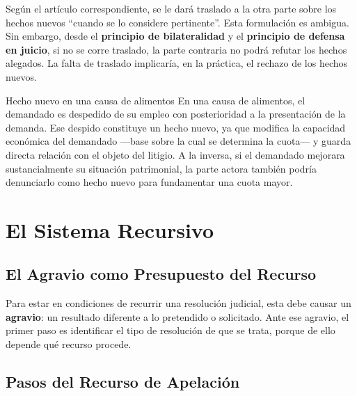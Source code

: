 \documentclass[12pt,oneside]{book}
\begin{document}
Según el artículo correspondiente, se le dará traslado a la otra parte sobre los hechos nuevos ``cuando se lo considere pertinente''. Esta formulación es ambigua. Sin embargo, desde el \textbf{principio de bilateralidad} y el \textbf{principio de defensa en juicio}, si no se corre traslado, la parte contraria no podrá refutar los hechos alegados. La falta de traslado implicaría, en la práctica, el rechazo de los hechos nuevos.

\begin{example}{Hecho nuevo en una causa de alimentos}
En una causa de alimentos, el demandado es despedido de su empleo con posterioridad a la presentación de la demanda. Ese despido constituye un hecho nuevo, ya que modifica la capacidad económica del demandado —base sobre la cual se determina la cuota— y guarda directa relación con el objeto del litigio. A la inversa, si el demandado mejorara sustancialmente su situación patrimonial, la parte actora también podría denunciarlo como hecho nuevo para fundamentar una cuota mayor.
\end{example}

\section{El Sistema Recursivo}

\subsection{El Agravio como Presupuesto del Recurso}

Para estar en condiciones de recurrir una resolución judicial, esta debe causar un \textbf{agravio}: un resultado diferente a lo pretendido o solicitado. Ante ese agravio, el primer paso es identificar el tipo de resolución de que se trata, porque de ello depende qué recurso procede.

\subsection{Pasos del Recurso de Apelación}
\end{document}
